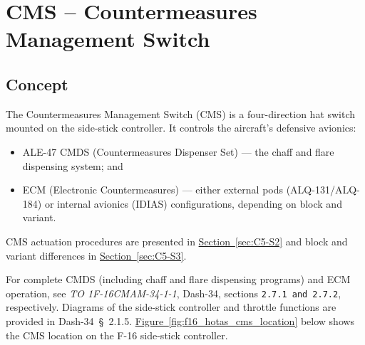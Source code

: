 \documentclass[11pt, a4paper, twoside]{report}
\newcommand{\dashref}[1]{Dash-34~\S~#1}
\newcommand{\dashrefs}[1]{\textit{TO 1F-16CMAM-34-1-1}, Dash-34, sections \texttt{#1}}
\newcommand{\secref}[1]{\hyperref[#1]{Section~\ref*{#1}}}
\newcommand{\figref}[1]{\hyperref[#1]{Figure~\ref*{#1}}}
\begin{document}

\chapter{CMS – Countermeasures Management Switch}
\label{chap:C5}

\section{Concept}
\label{sec:C5-S1}

The Countermeasures Management Switch (CMS) is a four-direction hat switch mounted on the side-stick controller. It controls the aircraft's defensive avionics:

\begin{itemize}
  \item ALE-47 CMDS (Countermeasures Dispenser Set) --- the chaff and flare dispensing system; and
  \item ECM (Electronic Countermeasures) --- either external pods (ALQ-131/ALQ-184) or internal avionics (IDIAS) configurations, depending on block and variant.
\end{itemize}

CMS actuation procedures are presented in \secref{sec:C5-S2} and block and variant differences in \secref{sec:C5-S3}.

For complete CMDS (including chaff and flare dispensing programs) and ECM operation, see \dashrefs{2.7.1 and 2.7.2}, respectively. Diagrams of the side-stick controller and throttle functions are provided in \dashref{2.1.5}. \figref{fig:f16_hotas_cms_location} below shows the CMS location on the F-16 side-stick controller.
\end{document}
